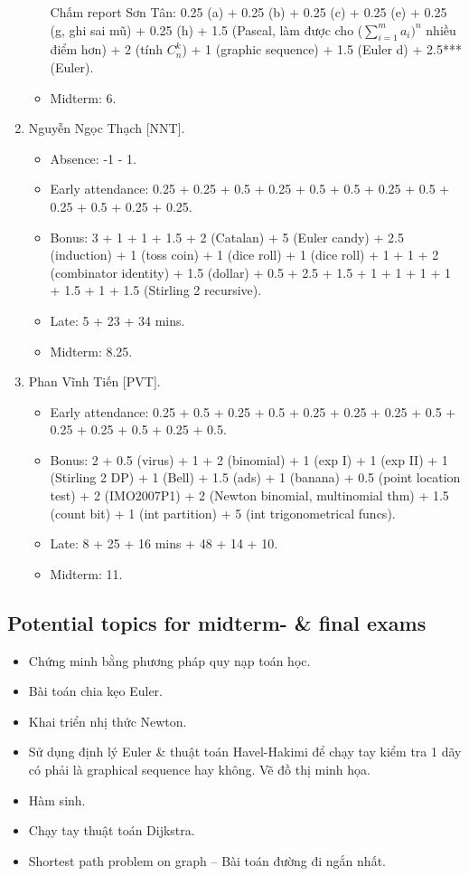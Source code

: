 \documentclass{article}
\begin{document}
\begin{enumerate}
\begin{itemize}
		Chấm report Sơn Tân: 0.25 (a) + 0.25 (b) + 0.25 (c) + 0.25 (e) + 0.25 (g, ghi sai mũ) + 0.25 (h) + 1.5 (Pascal, làm được cho ($\sum_{i=1}^m a_i)^n$ nhiều điểm hơn) + 2 (tính $C_n^k$) + 1 (graphic sequence) + 1.5 (Euler d) + 2.5*** (Euler).
        \item Midterm: 6.
	\end{itemize}
	\item {\sc Nguyễn Ngọc Thạch [NNT].}
	\begin{itemize}
        \item Absence: -1 - 1.
		\item Early attendance: 0.25 + 0.25 + 0.5 + 0.25 + 0.5 + 0.5 + 0.25 + 0.5 + 0.25 + 0.5 + 0.25 + 0.25.
		\item Bonus: 3 + 1 + 1 + 1.5 + 2 (Catalan) + 5 (Euler candy) + 2.5 (induction) + 1 (toss coin) + 1 (dice roll) + 1 (dice roll) + 1 + 1 + 2 (combinator identity) + 1.5 (dollar) + 0.5 + 2.5 + 1.5 + 1 + 1 + 1 + 1 + 1.5 + 1 + 1.5 (Stirling 2 recursive).
		\item Late: 5 + 23 + 34 mins.
        \item Midterm: 8.25.
	\end{itemize}
	\item {\sc Phan Vĩnh Tiến [PVT].}
	\begin{itemize}
		\item Early attendance: 0.25 + 0.5 + 0.25 + 0.5 + 0.25 + 0.25 + 0.25 + 0.5 + 0.25 + 0.25 + 0.5 + 0.25 + 0.5.
		\item Bonus: 2 + 0.5 (virus) + 1 + 2 (binomial) + 1 (exp I) + 1 (exp II) + 1 (Stirling 2 DP) + 1 (Bell) + 1.5 (ads) + 1 (banana) + 0.5 (point location test) + 2 (IMO2007P1) + 2 (Newton binomial, multinomial thm) + 1.5 (count bit) + 1 (int partition) + 5 (int trigonometrical funcs).
        \item Late: 8 + 25 + 16 mins + 48 + 14 + 10.
        \item Midterm: 11.
	\end{itemize}
\end{enumerate}


\subsection{Potential topics for midterm- \& final exams}

\begin{itemize}
	\item Chứng minh bằng phương pháp quy nạp toán học.
	\item Bài toán chia kẹo Euler.
	\item Khai triển nhị thức Newton.
	\item Sử dụng định lý Euler \& thuật toán Havel-Hakimi để chạy tay kiểm tra 1 dãy có phải là graphical sequence hay không. Vẽ đồ thị minh họa.
	\item Hàm sinh.
	\item Chạy tay thuật toán Dijkstra.
	\item Shortest path problem on graph -- Bài toán đường đi ngắn nhất.
\end{itemize}
\end{document}
